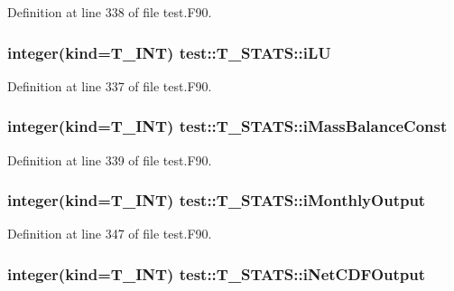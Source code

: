 Definition at line 338 of file test.F90.

\hypertarget{typetest_1_1_t___s_t_a_t_s_acfc6193a73958523b2b6e9d493d80927}{
\subsubsection[{iLU}]{\setlength{\rightskip}{0pt plus 5cm}integer(kind={\bf T\_\-INT}) {\bf test::T\_\-STATS::iLU}}}
\label{typetest_1_1_t___s_t_a_t_s_acfc6193a73958523b2b6e9d493d80927}


Definition at line 337 of file test.F90.

\hypertarget{typetest_1_1_t___s_t_a_t_s_ab8406e15910cd4509bf6426b20dccb3b}{
\subsubsection[{iMassBalanceConst}]{\setlength{\rightskip}{0pt plus 5cm}integer(kind={\bf T\_\-INT}) {\bf test::T\_\-STATS::iMassBalanceConst}}}
\label{typetest_1_1_t___s_t_a_t_s_ab8406e15910cd4509bf6426b20dccb3b}


Definition at line 339 of file test.F90.

\hypertarget{typetest_1_1_t___s_t_a_t_s_aa292f0213f5d2c2f964f21bdc35680f2}{
\subsubsection[{iMonthlyOutput}]{\setlength{\rightskip}{0pt plus 5cm}integer(kind={\bf T\_\-INT}) {\bf test::T\_\-STATS::iMonthlyOutput}}}
\label{typetest_1_1_t___s_t_a_t_s_aa292f0213f5d2c2f964f21bdc35680f2}


Definition at line 347 of file test.F90.

\hypertarget{typetest_1_1_t___s_t_a_t_s_a85598614bf320c3944f0a3a66e8181fa}{
\subsubsection[{iNetCDFOutput}]{\setlength{\rightskip}{0pt plus 5cm}integer(kind={\bf T\_\-INT}) {\bf test::T\_\-STATS::iNetCDFOutput}}}
\label{typetest_1_1_t___s_t_a_t_s_a85598614bf320c3944f0a3a66e8181fa}


